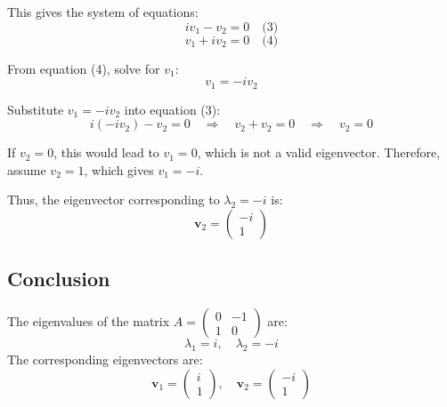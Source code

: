 \documentclass[11pt]{article}
\begin{document}
This gives the system of equations:
\[
iv_1 - v_2 = 0 \quad \text{(3)}
\]
\[
v_1 + iv_2 = 0 \quad \text{(4)}
\]

From equation (4), solve for \( v_1 \):
\[
v_1 = -iv_2
\]

Substitute \( v_1 = -iv_2 \) into equation (3):
\[
i(-iv_2) - v_2 = 0 \quad \Rightarrow \quad v_2 + v_2 = 0 \quad \Rightarrow \quad v_2 = 0
\]

If \( v_2 = 0 \), this would lead to \( v_1 = 0 \), which is not a valid eigenvector. Therefore, assume \( v_2 = 1 \), which gives \( v_1 = -i \).

Thus, the eigenvector corresponding to \( \lambda_2 = -i \) is:
\[
\mathbf{v}_2 = \begin{pmatrix} -i \\ 1 \end{pmatrix}
\]

\newpage

\subsection{Conclusion}

The eigenvalues of the matrix \( A = \begin{pmatrix} 0 & -1 \\ 1 & 0 \end{pmatrix} \) are:
\[
\lambda_1 = i, \quad \lambda_2 = -i
\]
The corresponding eigenvectors are:
\[
\mathbf{v}_1 = \begin{pmatrix} i \\ 1 \end{pmatrix}, \quad \mathbf{v}_2 = \begin{pmatrix} -i \\ 1 \end{pmatrix}
\]
\end{document}
